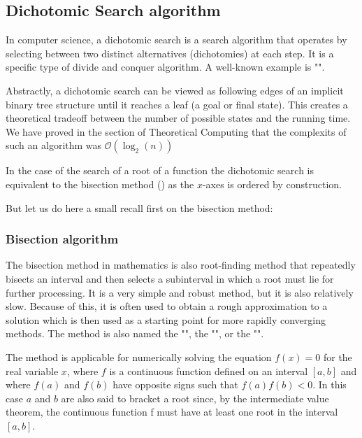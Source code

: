 	\subsection{Dichotomic Search algorithm}
	In computer science, a dichotomic search is a search algorithm that operates by selecting between two distinct alternatives (dichotomies) at each step. It is a specific type of divide and conquer algorithm. A well-known example is "".

	Abstractly, a dichotomic search can be viewed as following edges of an implicit binary tree structure until it reaches a leaf (a goal or final state). This creates a theoretical tradeoff between the number of possible states and the running time. We have proved in the section of Theoretical Computing that the complexits of such an algorithm was $\mathcal{O}(\log_2(n))$

	In the case of the search of a root of a function the dichotomic search is equivalent to the bisection method () as the $x$-axes is ordered by construction.
	
	But let us do here a small recall first on the bisection method:
	
	\subsubsection{Bisection algorithm}
	
	The bisection method in mathematics is also root-finding method that repeatedly bisects an interval and then selects a subinterval in which a root must lie for further processing. It is a very simple and robust method, but it is also relatively slow. Because of this, it is often used to obtain a rough approximation to a solution which is then used as a starting point for more rapidly converging methods. The method is also named the "", the "", or the "".
	
	The method is applicable for numerically solving the equation $f(x) = 0$ for the real variable $x$, where $f$ is a continuous function defined on an interval $[a, b]$ and where $f(a)$ and $f(b)$ have opposite signs such that $f(a)f(b)<0$. In this case $a$ and $b$ are also said to bracket a root since, by the intermediate value theorem, the continuous function f must have at least one root in the interval $[a, b]$.


